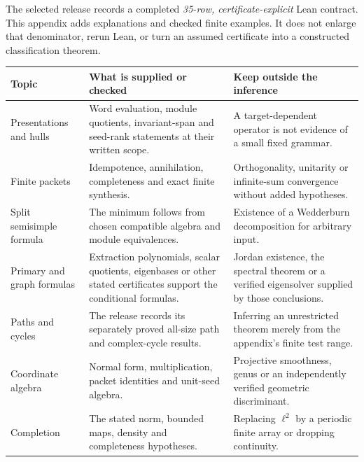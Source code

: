 
The selected release records a completed \emph{35-row, certificate-explicit} Lean contract. This appendix adds explanations and checked finite examples. It does not enlarge that denominator, rerun Lean, or turn an assumed certificate into a constructed classification theorem.

{\small
\begin{tabularx}{\linewidth}{@{}>{\raggedright\arraybackslash}p{.23\linewidth}Y>{\raggedright\arraybackslash}p{.25\linewidth}@{}}\toprule
\textbf{Topic} & \textbf{What is supplied or checked} & \textbf{Keep outside the inference}\\\midrule
Presentations and hulls & Word evaluation, module quotients, invariant-span and seed-rank statements at their written scope. & A target-dependent operator is not evidence of a small fixed grammar.\\
Finite packets & Idempotence, annihilation, completeness and exact finite synthesis. & Orthogonality, unitarity or infinite-sum convergence without added hypotheses.\\
Split semisimple formula & The minimum follows from chosen compatible algebra and module equivalences. & Existence of a Wedderburn decomposition for arbitrary input.\\
Primary and graph formulas & Extraction polynomials, scalar quotients, eigenbases or other stated certificates support the conditional formulas. & Jordan existence, the spectral theorem or a verified eigensolver supplied by those conclusions.\\
Paths and cycles & The release records its separately proved all-size path and complex-cycle results. & Inferring an unrestricted theorem merely from the appendix's finite test range.\\
Coordinate algebra & Normal form, multiplication, packet identities and unit-seed algebra. & Projective smoothness, genus or an independently verified geometric discriminant.\\
Completion & The stated norm, bounded maps, density and completeness hypotheses. & Replacing $\ell^2$ by a periodic finite array or dropping continuity.\\\bottomrule
\end{tabularx}}

